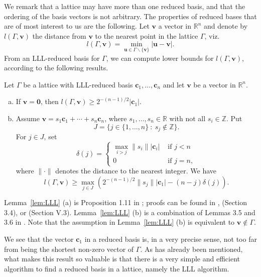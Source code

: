 We remark that a lattice may have more than one reduced basis, and that the ordering of the basis vectors is not arbitrary. The properties of reduced bases that are of most interest to us are the following. Let $\mathbf{v}$ a vector in $\mathbb{R}^n$ and denote by $l(\Gamma,\mathbf{v})$ the distance from $\mathbf{v}$ to the nearest point in the lattice $\Gamma$, viz.
\[l(\Gamma,\mathbf{v}) = \min_{\mathbf{u} \in \Gamma \backslash\{\mathbf{v}\}} |\mathbf{u} - \mathbf{v}|.\]
From an LLL-reduced basis for $\Gamma$, we can compute lower bounds for $l(\Gamma,\mathbf{v})$, according to the following results. 

\begin{lemma} \label{lem:LLL}
Let $\Gamma$ be a lattice with LLL-reduced basis $\mathbf{c}_1, \dots, \mathbf{c}_n$ and let $\mathbf{v}$ be a vector in $\mathbb{R}^n$. 
\begin{enumerate}[(a)]
\item If $\mathbf{v} = \mathbf{0}$, then $l(\Gamma,\mathbf{v}) \geq 2^{-(n-1)/2}|\mathbf{c}_1|$.
\item Assume $\mathbf{v} = s_1\mathbf{c}_1 + \cdots + s_n \mathbf{c}_n$, where $s_1, \dots, s_n \in \mathbb{R}$ with not all $s_i \in \mathbb{Z}$. Put 
\[J = \{j \in \{1, \dots, n\} \ : \ s_j \notin \mathbb{Z} \}.\]
For $j \in J$, set 
\[\delta(j) = 
\begin{cases}
\max_{i > j} \|s_i \| |\mathbf{c}_i| 	& \text{ if } j < n\\
0 							& \text{ if } j = n,
\end{cases}\]
where $\| \cdot \|$ denotes the distance to the nearest integer. We have
\[l(\Gamma,\mathbf{v}) \geq \max_{j \in J}\left(2^{-(n-1)/2}\| s_j\| |\mathbf{c}_1| - (n-j)\delta(j)\right).\]
\end{enumerate}
\end{lemma}
Lemma~\ref{lem:LLL} (a) is Proposition 1.11 in \cite{LLL}; proofs can be found in \cite{LLL}, \cite{Weg0} (Section 3.4), or \cite{Sm} (Section V.3). Lemma~\ref{lem:LLL} (b) is a combination of Lemmas 3.5 and 3.6 in \cite{Weg0}. Note that the assumption in Lemma~\ref{lem:LLL} (b) is equivalent to ${\mathbf{v} \notin \Gamma}$. 

We see that the vector $\mathbf{c}_1$ in a reduced basis is, in a very precise sense, not too far from being the shortest non-zero vector of $\Gamma$. As has already been mentioned, what makes this result so valuable is that there is a very simple and efficient algorithm to find a reduced basis in a lattice, namely the LLL algorithm.


